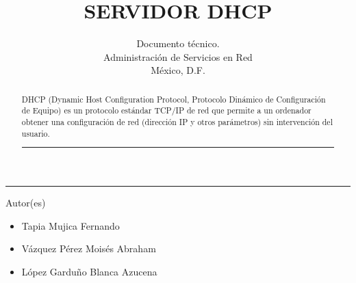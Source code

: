 \title{SERVIDOR DHCP}
\author{Documento técnico.\\
\small Administración de Servicios en Red\\
\small México, D.F.
}

\vspace{2cm}
\maketitle		
	\vspace*{-1cm}
	\begin{center}\rule{0.9\textwidth}{0.1mm}\end{center}
	\begin{abstract}
	\normalsize DHCP (Dynamic Host Configuration Protocol, Protocolo Dinámico de Configuración de Equipo) es un protocolo estándar TCP/IP de red que permite a un ordenador obtener una configuración de red (dirección IP y otros parámetros) sin intervención del usuario.
	\begin{center}\rule{0.9\textwidth}{0.1mm}\end{center}
	\vspace*{0.5cm}
	\end{abstract}
	\vspace*{9cm}
\small Autor(es)
\begin{itemize}
	\item Tapia Mujica Fernando
	\item Vázquez Pérez Moisés Abraham 
	\item López Garduño Blanca Azucena
\end{itemize}

